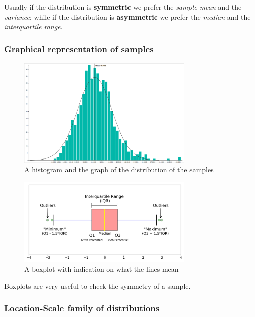 \documentclass[12pt]{extarticle}
\begin{document}
Usually if the distribution is \textbf{symmetric} we prefer the \textit{sample mean} and the \textit{variance}; while if the distribution is \textbf{asymmetric} we prefer the \textit{median} and the \textit{interquartile range}.

\subsubsection{Graphical representation of samples}

\begin{figure}[H]
    \centering
    \includegraphics[width=0.75\textwidth]{assets/statistics/histogram.png}
    \caption{A histogram and the graph of the distribution of the samples}
\end{figure}

\begin{figure}[H]
    \centering
    \includegraphics[width=0.75\textwidth]{assets/statistics/boxplot.png}
    \caption{A boxplot with indication on what the lines mean}
\end{figure}

Boxplots are very useful to check the symmetry of a sample.

\subsubsection{Location-Scale family of distributions}
\end{document}
